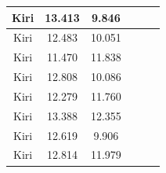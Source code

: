 \begin{longtable}{|c|c|c|c|c|c|}
  Kiri           & 13.413              & 9.846            \\ \hline
  Kiri           & 12.483              & 10.051           \\ \hline
  Kiri           & 11.470              & 11.838           \\ \hline
  Kiri           & 12.808              & 10.086           \\ \hline
  Kiri           & 12.279              & 11.760           \\ \hline
  Kiri           & 13.388              & 12.355           \\ \hline
  Kiri           & 12.619              & 9.906            \\ \hline
  Kiri           & 12.814              & 11.979           \\ \hline
\end{longtable}

